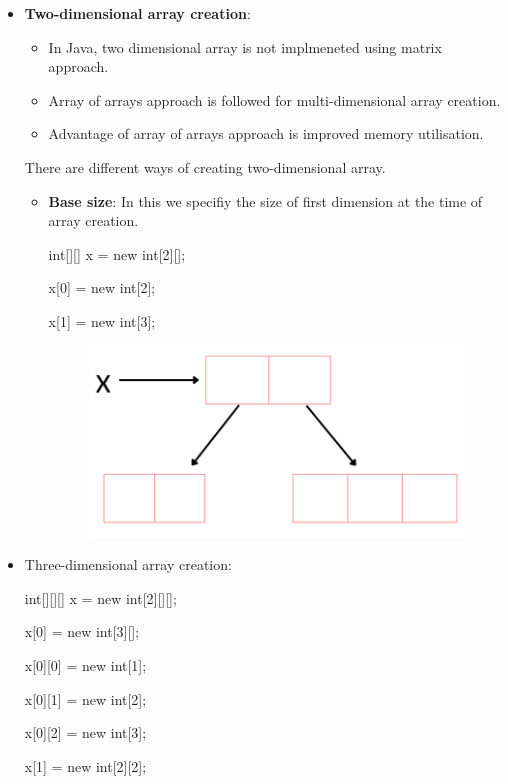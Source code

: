 \begin{flushleft}
\begin{itemize}
\begin{itemize}
			
		\end{itemize}
		
		\newpage
		\item \textbf{Two-dimensional array creation}:
		\begin{itemize}
			\item In Java, two dimensional array is not implmeneted using matrix approach.
			\item Array of arrays approach is followed for multi-dimensional array creation.
			\item Advantage of array of arrays approach is improved memory utilisation.
			
			
		\end{itemize}
		\bigskip
		
		There are different ways of creating two-dimensional array.
		\begin{itemize}
			\item \textbf{Base size}: In this we specifiy the size of first dimension at the time of array creation.
			\begin{tcolorbox}[breakable,notitle,boxrule=-0pt,colback=code,colframe=code]
				\color{black}
				\font=8pt
				int[][] x = new int[2][]; \par
				x[0] = new int[2]; \par
				x[1] = new int[3];
				\font=4pt
			\end{tcolorbox}
			
			\begin{figure}[h!]
				\centering
				\includegraphics[scale=.45]{content/chapter4/images/two.png}
			\end{figure}	
			
			\newpage
			
		\end{itemize}
		
		\item Three-dimensional array creation:
		\begin{tcolorbox}[breakable,notitle,boxrule=-0pt,colback=code,colframe=code]
			\color{black}
			\font=8pt
			int[][][] x = new int[2][][]; \par
			x[0] = new int[3][]; \par
			x[0][0] = new int[1]; \par
			x[0][1] = new int[2]; \par
			x[0][2] = new int[3]; \par
			x[1] = new int[2][2];
			\font=4pt
		\end{tcolorbox}
		

\end{itemize}
\end{flushleft}
